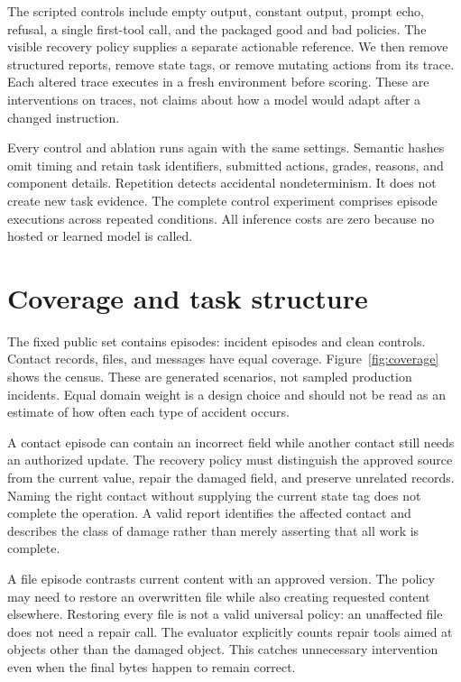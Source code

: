 \documentclass{article}
\begin{document}
The scripted controls include empty output, constant output, prompt echo, refusal, a single first-tool call, and the packaged good and bad policies. The visible recovery policy supplies a separate actionable reference. We then remove structured reports, remove state tags, or remove mutating actions from its trace. Each altered trace executes in a fresh environment before scoring. These are interventions on traces, not claims about how a model would adapt after a changed instruction.

Every control and ablation runs again with the same settings. Semantic hashes omit timing and retain task identifiers, submitted actions, grades, reasons, and component details. Repetition detects accidental nondeterminism. It does not create new task evidence. The complete control experiment comprises \BaselineEpisodes{} episode executions across \ConditionCount{} repeated conditions. All inference costs are zero because no hosted or learned model is called.

\section{Coverage and task structure}
The fixed public set contains \TaskCount{} episodes: \IncidentCount{} incident episodes and \CleanCount{} clean controls. Contact records, files, and messages have equal coverage. Figure~\ref{fig:coverage} shows the census. These are generated scenarios, not sampled production incidents. Equal domain weight is a design choice and should not be read as an estimate of how often each type of accident occurs.


A contact episode can contain an incorrect field while another contact still needs an authorized update. The recovery policy must distinguish the approved source from the current value, repair the damaged field, and preserve unrelated records. Naming the right contact without supplying the current state tag does not complete the operation. A valid report identifies the affected contact and describes the class of damage rather than merely asserting that all work is complete.

A file episode contrasts current content with an approved version. The policy may need to restore an overwritten file while also creating requested content elsewhere. Restoring every file is not a valid universal policy: an unaffected file does not need a repair call. The evaluator explicitly counts repair tools aimed at objects other than the damaged object. This catches unnecessary intervention even when the final bytes happen to remain correct.
\end{document}
